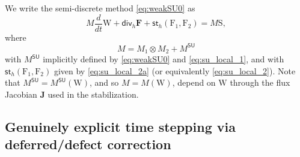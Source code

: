 \documentclass[a4paper,10pt]{article}
\begin{document}
 We write the semi-discrete method \eqref{eq:weakSU0} as 
\begin{equation}\label{eq:weakG1-SU}
M \dfrac{d }{dt} \mathrm{W} +
 \textsf{div}_h \mathbf{F}    + \mathsf{st}_h(\mathrm{F}_1,\mathrm{F}_2)=
M  \mathrm{S},
\end{equation}
where
$$
M = M_1\otimes  M_2   + M^{\textsf{SU}}
$$
with $M^{\textsf{SU}}$ implicitly defined by \eqref{eq:weakSU0} and \eqref{eq:su_local_1}, and with $\mathsf{st}_h(\mathrm{F}_1,\mathrm{F}_2)$
given by \eqref{eq:su_local_2a} (or equivalently \eqref{eq:su_local_2}). Note that $M^{\textsf{SU}}=M^{\textsf{SU}}( \mathrm{W})$, and so $M=M(\mathrm{W})$, 
depend on $\mathrm{W}$ through the flux Jacobian $\mathbf{J}$ used in the stabilization.

%
%
%
%
%
%

%
%
% 
%


\subsection{Genuinely explicit time stepping via deferred/defect correction}\label{sec:DeC}
\end{document}
